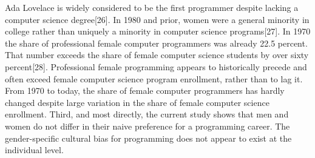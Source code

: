 \documentclass[review]{elsarticle}
\begin{document}
Ada Lovelace is widely considered to be the first programmer despite lacking a computer science degree[26].
In 1980 and prior, women were a general minority in college rather than uniquely a minority in computer science programs[27].
In 1970 the share of professional female computer programmers was already 22.5 percent.
That number exceeds the share of female computer science students by over sixty percent[28].
Professional female programming appears to historically precede and often exceed female computer science program enrollment,
rather than to lag it.
From 1970 to today, the share of female computer programmers has hardly changed despite large variation in the share of female computer science enrollment.
Third, and most directly, the current study shows that men and women do not differ in their naive preference for a programming career.
The gender-specific cultural bias for programming does not appear to exist at the individual level.

\end{document}
